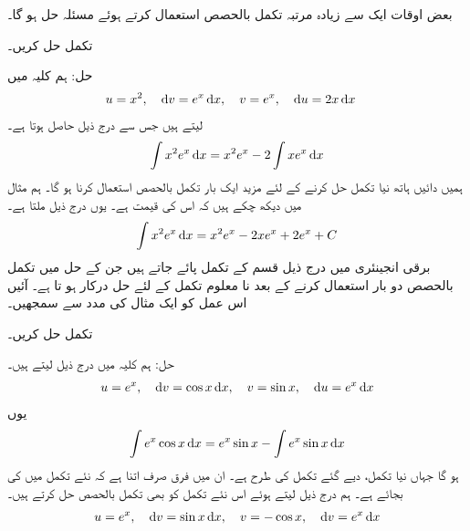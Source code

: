 بعض اوقات ایک سے زیادہ مرتبہ تکمل بالحصص  استعمال کرتے ہوئے مسئلہ حل ہو گا۔

تکمل  حل کریں۔ 

حل:\quad
ہم کلیہ  میں
\begin{align*}
u&=x^2,\quad \dif v=e^x\dif x,\quad v=e^x,\quad \dif u=2x\dif x
\end{align*}
لیتے ہیں جس سے درج ذیل حاصل ہوتا ہے۔
\begin{align*}
\int x^2e^x\dif x=x^2e^x-2\int xe^x\dif x
\end{align*} 
ہمیں دائیں ہاتھ نیا تکمل حل کرنے کے لئے مزید ایک بار تکمل بالحصص استعمال کرنا ہو گا۔ ہم مثال  میں دیکھ چکے ہیں کہ اس کی قیمت  ہے۔ یوں درج ذیل ملتا ہے۔
\begin{align*}
\int x^2e^x\dif x=x^2e^x-2xe^x+2e^x+C
\end{align*}
برقی انجینئری میں درج ذیل قسم کے تکمل پائے جاتے ہیں جن کے حل میں تکمل بالحصص دو بار استعمال کرنے کے بعد نا معلوم تکمل کے لئے حل درکار ہو تا ہے۔ آئیں اس عمل کو ایک مثال کی مدد سے سمجھیں۔

تکمل  حل کریں۔

حل:\quad
ہم کلیہ  میں درج ذیل لیتے ہیں۔
\begin{align*}
u=e^x,\quad \dif v=\cos x\dif x,\quad v=\sin x,\quad \dif u=e^x\dif x
\end{align*}
یوں
\begin{align*}
\int e^x\cos x\dif x=e^x\sin x-\int e^x\sin x\dif x
\end{align*}
ہو گا جہاں نیا تکمل، دیے گئے تکمل کی طرح ہے۔ ان میں فرق صرف اتنا ہے کہ نئے تکمل میں  کی بجائے  ہے۔ ہم درج ذیل لیتے ہوئے اس نئے تکمل کو بھی تکمل بالحصص حل کرتے ہیں۔
\begin{align*}
u=e^x,\quad \dif v=\sin x\dif x,\quad v=-\cos x,\quad \dif v=e^x\dif x
\end{align*}

